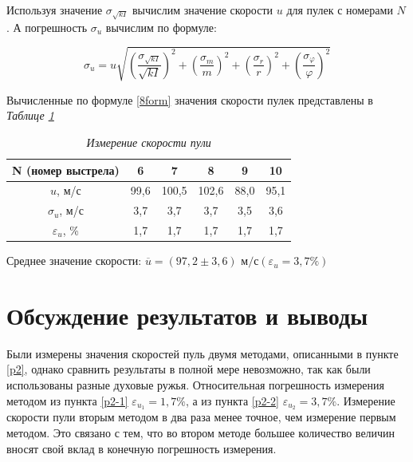 \documentclass[a4paper,12pt]{article} %
\begin{document}
Используя значение $\sigma_{\sqrt{kI}}$ вычислим значение скорости $u$ для пулек с номерами $N$. А погрешность $\sigma_u$ вычислим по формуле:

\begin{equation}
    \sigma_u = u \sqrt{ \left( \frac{\sigma_{\sqrt{kI}}}{\sqrt{kI}} \right)^2 + \left( \frac{\sigma_m}{m} \right)^2 + \left( \frac{\sigma_r}{r} \right)^2 + \left( \frac{\sigma_\varphi}{\varphi} \right)^2}
\end{equation}

Вычисленные по формуле \eqref{8form} значения скорости пулек представлены в \textit{Таблице  \ref{tab:tab3}}

\begin{table}[!ht]
    \centering
    \begin{tabular}{|c|c|c|c|c|c|}
    \hline
        N (номер выстрела) & 6 & 7 & 8 & 9 & 10 \\ \hline
        $u$, м/с & 99,6 & 100,5 & 102,6 & 88,0 & 95,1 \\ \hline
        $\sigma_u$, м/с & 3,7 & 3,7 & 3,7 & 3,5 & 3,6 \\ \hline
        $\varepsilon_u$, \% & 1,7 & 1,7 & 1,7 & 1,7 & 1,7 \\ \hline
    \end{tabular}
    \caption{\textit{Измерение скорости пули}}
    \label{tab:tab3}
\end{table}

Среднее значение скорости: $\overline{u} = \left( 97,2 \pm 3,6 \right) \text{ м/с} \left( \varepsilon_u = 3,7 \% \right)$\\


\section{Обсуждение результатов и выводы}

Были измерены значения скоростей пуль двумя методами, описанными в пункте \ref{p2}, однако сравнить результаты в полной мере невозможно, так как были использованы разные духовые ружья. Относительная погрешность измерения методом из пункта \ref{p2-1} $\varepsilon_{u_1} = 1,7 \%$, а из пункта \ref{p2-2} $\varepsilon_{u_2} = 3,7 \%$. Измерение скорости пули вторым методом в два раза менее точное, чем измерение первым методом. Это связано с тем, что во втором методе большее количество величин вносят свой вклад в конечную погрешность измерения.
\end{document}
